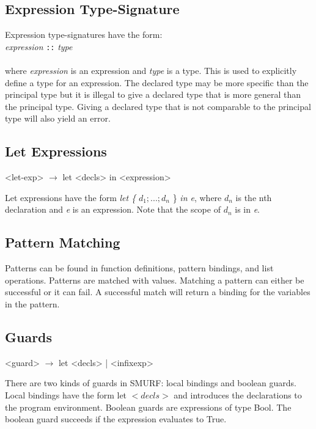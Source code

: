 \subsection{Expression Type-Signature}
Expression type-signatures have the form: \\

  \emph{expression} \texttt{::} \emph{type} \\ \\
  where \emph{expression} is an expression and \emph{type} is a type. This is used to explicitly define a type for an expression. The declared type may be more specific than the principal type but it is illegal to give a declared type that is more general than the principal type. Giving a declared type that is not comparable to the principal type will also yield an error.

\subsection{Let Expressions}
\begin{grammar}
<let-exp> $\rightarrow$ let <decls> in <expression>
\end{grammar}
Let expressions have the form \emph{let \{} $d_1;...;d_n$ \} \emph{in e}, where $d_n$ is the nth declaration and \emph{e} is an expression. Note that the scope of $d_n$ is in \emph{e}.


\subsection{Pattern Matching}

Patterns can be found in function definitions, pattern bindings, and list operations. Patterns are matched with values. Matching a pattern can either be successful or it can fail. A successful match will return  a binding for the variables in the pattern. 

\subsection{Guards}
\begin{grammar}
<guard> $\rightarrow$  let <decls> | <infixexp>          
\end{grammar}

There are two kinds of guards in SMURF: local bindings and boolean guards. Local bindings have the form let $<decls>$ and introduces the declarations to the program environment. Boolean guards are expressions of type Bool. The boolean guard succeeds if the expression evaluates to True.

